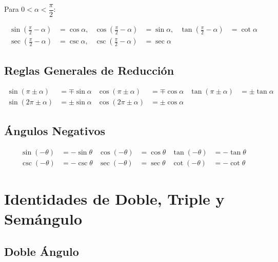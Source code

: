 \documentclass[12pt,a4paper]{article}
\begin{document}
Para $0 < \alpha < \dfrac{\pi}{2}$:

\begin{tcolorbox}[formulabox]
\begin{align*}
\sin\!\left(\tfrac{\pi}{2}-\alpha\right) &= \cos\alpha, &
\cos\!\left(\tfrac{\pi}{2}-\alpha\right) &= \sin\alpha, &
\tan\!\left(\tfrac{\pi}{2}-\alpha\right) &= \cot\alpha \\[4pt]
\sec\!\left(\tfrac{\pi}{2}-\alpha\right) &= \csc\alpha, &
\csc\!\left(\tfrac{\pi}{2}-\alpha\right) &= \sec\alpha
\end{align*}
\end{tcolorbox}

\subsection{Reglas Generales de Reducción}

\begin{tcolorbox}[formulabox]
\begin{align*}
\sin(\pi\pm\alpha) &= \mp\sin\alpha &
\cos(\pi\pm\alpha) &= \mp\cos\alpha &
\tan(\pi\pm\alpha) &= \pm\tan\alpha \\[4pt]
\sin(2\pi\pm\alpha) &= \pm\sin\alpha &
\cos(2\pi\pm\alpha) &= \pm\cos\alpha
\end{align*}
\end{tcolorbox}

\subsection{Ángulos Negativos}

\begin{tcolorbox}[formulabox]
\begin{align*}
\sin(-\theta) &= -\sin\theta &
\cos(-\theta) &= \cos\theta &
\tan(-\theta) &= -\tan\theta \\[4pt]
\csc(-\theta) &= -\csc\theta &
\sec(-\theta) &= \sec\theta &
\cot(-\theta) &= -\cot\theta
\end{align*}
\end{tcolorbox}

\newpage

\section{Identidades de Doble, Triple y Semángulo}

\subsection{Doble Ángulo}
\end{document}
